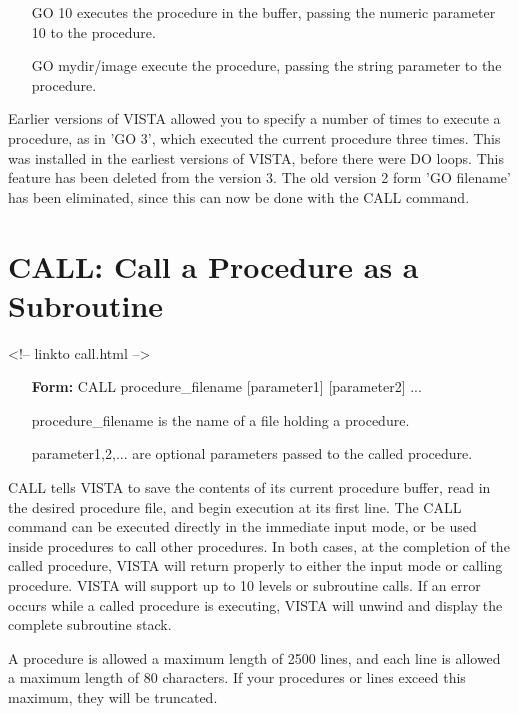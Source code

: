 \begin{itemize}
  \item[GO 10\hfill]{executes the procedure in the buffer,
       passing the numeric parameter 10 to the procedure.}
  \item[GO mydir/image\hfill]{execute the procedure, passing the
        string parameter to the procedure.}
\end{itemize}

Earlier versions of VISTA allowed you to specify a number of times to
execute a procedure, as in 'GO 3', which executed the current procedure
three times.  This was installed in the earliest versions of VISTA, before
there were DO loops.  This feature has been deleted from the version 3.
The old version 2 form 'GO filename' has been eliminated, since this can
now be done with the CALL command.

\section{CALL: Call a Procedure as a Subroutine}
\begin{rawhtml}
<!-- linkto call.html -->
\end{rawhtml}

\begin{itemize}
  \item[\textbf{Form: } CALL procedure\_filename {[parameter1]} {[parameter2]} ...\hfill]{}
  \item[procedure\_filename]{is the name of a file holding a procedure.}
  \item[parameter1,2,...]{are optional parameters passed to the called procedure.}
\end{itemize}

CALL tells VISTA to save the contents of its current procedure buffer, read
in the desired procedure file, and begin execution at its first line.  The
CALL command can be executed directly in the immediate input mode, or be
used inside procedures to call other procedures.  In both cases, at the
completion of the called procedure, VISTA will return properly to either
the input mode or calling procedure.  VISTA will support up to 10 levels or
subroutine calls.  If an error occurs while a called procedure is
executing, VISTA will unwind and display the complete subroutine stack.

A procedure is allowed a maximum length of 2500 lines, and each line is
allowed a maximum length of 80 characters.  If your procedures or lines
exceed this maximum, they will be truncated.


